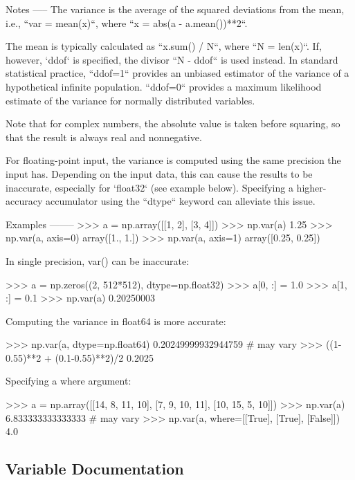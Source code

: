 \begin{DoxyVerb}
Notes
-----
The variance is the average of the squared deviations from the mean,
i.e.,  ``var = mean(x)``, where ``x = abs(a - a.mean())**2``.

The mean is typically calculated as ``x.sum() / N``, where ``N = len(x)``.
If, however, `ddof` is specified, the divisor ``N - ddof`` is used
instead.  In standard statistical practice, ``ddof=1`` provides an
unbiased estimator of the variance of a hypothetical infinite population.
``ddof=0`` provides a maximum likelihood estimate of the variance for
normally distributed variables.

Note that for complex numbers, the absolute value is taken before
squaring, so that the result is always real and nonnegative.

For floating-point input, the variance is computed using the same
precision the input has.  Depending on the input data, this can cause
the results to be inaccurate, especially for `float32` (see example
below).  Specifying a higher-accuracy accumulator using the ``dtype``
keyword can alleviate this issue.

Examples
--------
>>> a = np.array([[1, 2], [3, 4]])
>>> np.var(a)
1.25
>>> np.var(a, axis=0)
array([1.,  1.])
>>> np.var(a, axis=1)
array([0.25,  0.25])

In single precision, var() can be inaccurate:

>>> a = np.zeros((2, 512*512), dtype=np.float32)
>>> a[0, :] = 1.0
>>> a[1, :] = 0.1
>>> np.var(a)
0.20250003

Computing the variance in float64 is more accurate:

>>> np.var(a, dtype=np.float64)
0.20249999932944759 # may vary
>>> ((1-0.55)**2 + (0.1-0.55)**2)/2
0.2025

Specifying a where argument:

>>> a = np.array([[14, 8, 11, 10], [7, 9, 10, 11], [10, 15, 5, 10]])
>>> np.var(a)
6.833333333333333 # may vary
>>> np.var(a, where=[[True], [True], [False]])
4.0\end{DoxyVerb}
 

\subsection{Variable Documentation}
\mbox{\label{namespacenumpy_1_1core_1_1fromnumeric_ab2d6e3b11669e7f56523052edd3f88f6}} 
